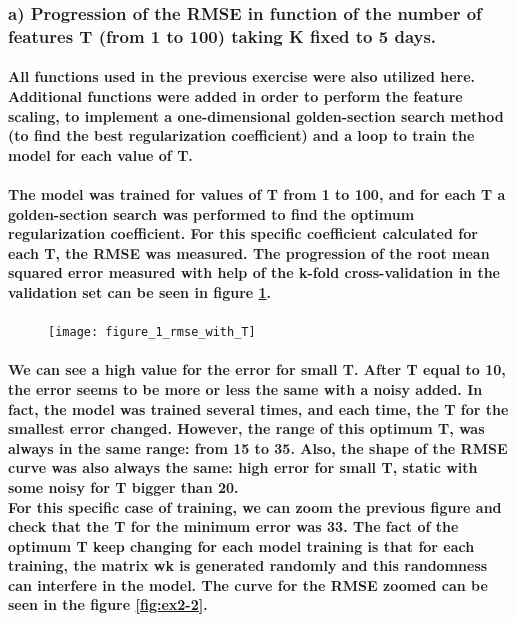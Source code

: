 \documentclass[a4paper]{article}
\begin{document}
\subsubsection{a) Progression of the RMSE in function of the number of features T (from 1 to 100) taking K fixed to 5 days.}

\paragraph{All functions used in the previous exercise were also utilized here. Additional functions were added in order to perform the feature scaling, to implement a one-dimensional golden-section search method (to find the best regularization coefficient) and a loop to train the model for each value of T.}

\paragraph{The model was trained for values of T from 1 to 100, and for each T a golden-section search was performed to find the optimum regularization coefficient. For this specific coefficient calculated for each T, the RMSE was measured. The progression of the root mean squared error measured with help of the k-fold cross-validation in the validation set can be seen in figure \ref{fig:ex2-1}.}

\begin{figure}[H]
    \centering
    \texttt{[image: figure\_1\_rmse\_with\_T]}
    \caption{}
    \label{fig:ex2-1}
\end{figure}

\paragraph{We can see a high value for the error for small T. After T equal to 10, the error seems to be more or less the same with a noisy added. In fact, the model was trained several times, and each time, the T for the smallest error changed. However, the range of this optimum T, was always in the same range: from 15 to 35. Also, the shape of the RMSE curve was also always the same: high error for small T, static with some noisy for T bigger than 20.
\\
For this specific case of training, we can zoom the previous figure and check that the T for the minimum error was 33. The fact of the optimum T keep changing for each model training is that for each training, the matrix wk is generated randomly and this randomness can interfere in the model. The curve for the RMSE zoomed can be seen in the figure \ref{fig:ex2-2}.}
\end{document}
